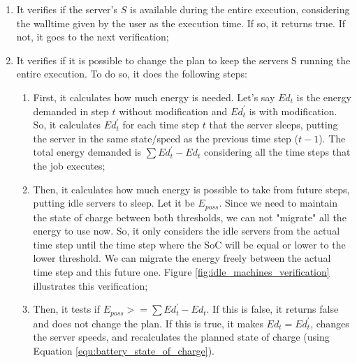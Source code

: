 \begin{enumerate}
    \item It verifies if the server's $S$ is available during the entire execution, considering the walltime given by the user as the execution time. If so, it returns true. If not, it goes to the next verification;
    \item It verifies if it is possible to change the plan to keep the servers S running the entire execution. To do so, it does the following steps:
    \begin{enumerate}
        \item First, it calculates how much energy is needed. Let's say $Ed_t$ is the energy demanded in step $t$ without modification and $Ed_t^{'}$ is with modification. So, it calculates $Ed_t^{'}$ for each time step $t$ that the server sleeps, putting the server in the same state/speed as the previous time step ($t-1$). The total energy demanded is $\sum Ed_t^{'} - Ed_t$ considering all the time steps that the job executes;
        \item Then, it calculates how much energy is possible to take from future steps, putting idle servers to sleep. Let it be $E_{poss}$. Since we need to maintain the state of charge between both thresholds, we can not "migrate" all the energy to use now. So, it only considers the idle servers from the actual time step until the time step where the SoC will be equal or lower to the lower threshold. We can migrate the energy freely between the actual time step and this future one. Figure \ref{fig:idle_machines_verification} illustrates this verification;
        \item Then, it tests if $E_{poss} >= \sum Ed_t^{'} - Ed_t$. If this is false, it returns false and does not change the plan. If this is true, it makes $Ed_t = Ed_t^{'}$, changes the server speeds, and recalculates the planned state of charge (using Equation \ref{equ:battery_state_of_charge}).
    \end{enumerate}
\end{enumerate}

